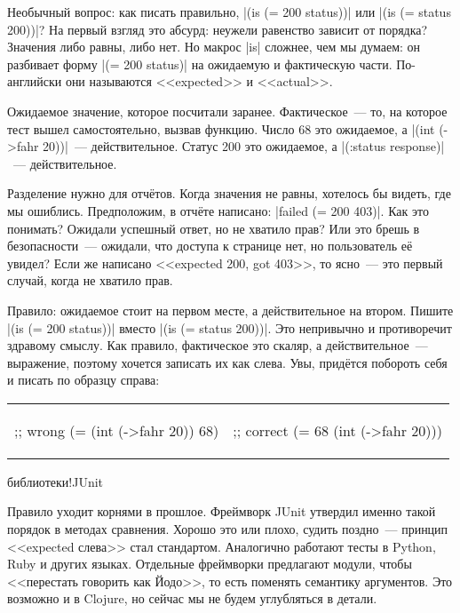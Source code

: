 Необычный вопрос: как писать правильно, \spverb|(is (= 200 status))| или
\spverb|(is (= status 200))|? На первый взгляд это абсурд: неужели равенство
зависит от порядка? Значения либо равны, либо нет. Но макрос \spverb|is|
сложнее, чем мы думаем: он разбивает форму \spverb|(= 200 status)| на ожидаемую
и фактическую части. По-английски они называются <<expected>> и <<actual>>.

Ожидаемое значение, которое посчитали заранее. Фактическое~--- то, на которое
тест вышел самостоятельно, вызвав функцию. Число 68 это ожидаемое, а
\spverb|(int (->fahr 20))|~--- действительное. Статус 200 это ожидаемое, а
\spverb|(:status response)|~--- действительное.

Разделение нужно для отчётов. Когда значения не равны, хотелось бы видеть, где
мы ошиблись. Предположим, в отчёте написано: \spverb|failed (= 200 403)|. Как
это понимать? Ожидали успешный ответ, но не хватило прав? Или это брешь в
безопасности~--- ожидали, что доступа к странице нет, но пользователь её увидел?
Если же написано <<expected 200, got 403>>, то ясно~--- это первый случай, когда
не хватило прав.

Правило: ожидаемое стоит на первом месте, а действительное на втором. Пишите
\spverb|(is (= 200 status))| вместо \spverb|(is (= status 200))|. Это непривычно
и противоречит здравому смыслу. Как правило, фактическое это скаляр, а
действительное~--- выражение, поэтому хочется записать их как слева. Увы,
придётся побороть себя и писать по образцу справа:

\noindent
\begin{tabular}{ @{}p{5cm} @{}p{5cm} }

\begin{english}
  \begin{clojure}
;; wrong
(= (int (->fahr 20)) 68)
  \end{clojure}
\end{english}

&

\begin{english}
  \begin{clojure}
;; correct
(= 68 (int (->fahr 20)))
  \end{clojure}
\end{english}

\end{tabular}

библиотеки!JUnit

Правило уходит корнями в прошлое. Фреймворк JUnit утвердил именно такой порядок
в методах сравнения.
Хорошо это или плохо, судить поздно~--- принцип <<expected слева>> стал
стандартом. Аналогично работают тесты в Python, Ruby и других языках. Отдельные
фреймворки предлагают модули, чтобы <<перестать говорить как Йодо>>, то есть
поменять семантику аргументов. Это возможно и в Clojure, но сейчас мы не будем
углубляться в детали.

